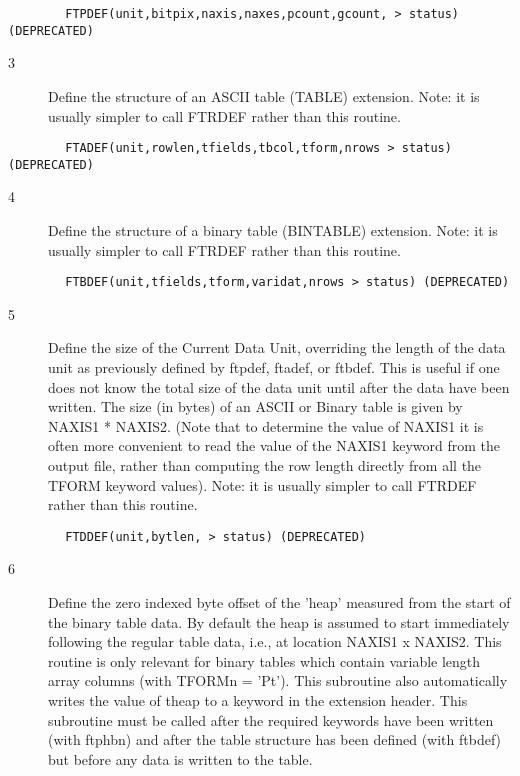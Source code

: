 \documentclass[11pt]{book}
\begin{document}
\begin{verbatim}
        FTPDEF(unit,bitpix,naxis,naxes,pcount,gcount, > status)  (DEPRECATED)
\end{verbatim}

\begin{description}
\item[3 ] Define the structure of an ASCII table (TABLE) extension. Note: it
   is usually simpler to call FTRDEF rather than this routine.
\end{description}

\begin{verbatim}
        FTADEF(unit,rowlen,tfields,tbcol,tform,nrows > status) (DEPRECATED)
\end{verbatim}

\begin{description}
\item[4 ] Define the structure of a binary table (BINTABLE) extension. Note: it
   is usually simpler to call FTRDEF rather than this routine.
\end{description}

\begin{verbatim}
        FTBDEF(unit,tfields,tform,varidat,nrows > status) (DEPRECATED)
\end{verbatim}

\begin{description}
\item[5 ] Define the size of the Current Data Unit, overriding the length
    of the data unit as previously defined by ftpdef, ftadef, or ftbdef.
    This is useful if one does not know the total size of the data unit until
    after the data have been written.  The size (in bytes) of an ASCII or
    Binary table is given by NAXIS1 * NAXIS2.  (Note that to determine the
    value of NAXIS1 it is often more convenient to read the value of the
    NAXIS1 keyword from the output file, rather than computing the row
    length directly from all the TFORM keyword values).  Note: it
   is usually simpler to call FTRDEF rather than this routine.
\end{description}

\begin{verbatim}
        FTDDEF(unit,bytlen, > status) (DEPRECATED)
\end{verbatim}

\begin{description}
\item[6 ] Define the zero indexed byte offset of the 'heap' measured from
    the start of the binary table data.  By default the heap is assumed
    to start immediately following the regular table data, i.e., at
    location NAXIS1 x NAXIS2.  This routine is only relevant for
    binary tables which contain variable length array columns (with
    TFORMn = 'Pt').  This subroutine also automatically writes
    the value of theap to a keyword in the extension header.  This
    subroutine must be called after the required keywords have been
    written (with ftphbn) and after the table structure has been defined
   (with ftbdef) but before any data is written to the table.
\end{description}
\end{document}
